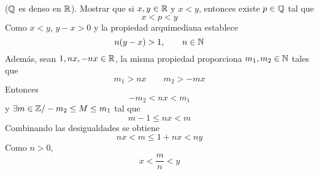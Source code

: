 \item ($\mathbb{Q}$ es denso en $\mathbb{R}$). Mostrar que si $x,y\in\mathbb{R}$ y $x<y$, entonces existe $p\in\mathbb{Q}$ tal que\[x<p<y\]
    Como $x<y$, $y-x>0$ y la propiedad arquimediana establece\[n(y-x)>1,\qquad n\in\mathbb{N}\]
    Además, sean $1,nx,-nx\in\mathbb{R}$, la misma propiedad proporciona $m_1,m_2\in\mathbb{N}$ tales que\[m_1>nx\qquad m_2>-mx\]
    Entonces\[-m_2<nx<m_1\] y $\exists m\in\mathbb{Z}/-m_2\leq M\leq m_1$ tal que\[m-1\leq nx<m\]
    Combinando las desigualdades se obtiene \[nx<m\leq1+nx<ny\]
    Como $n>0$, \[x<\frac{m}{n}<y\]